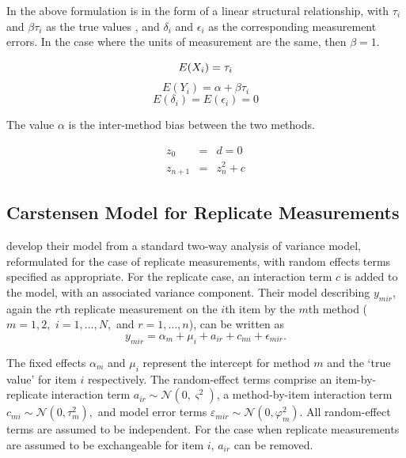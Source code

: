 \documentclass[12pt, a4paper]{report}
\theoremstyle{plain}
\theoremstyle{definition}
\theoremstyle{remark}
\begin{document}
	In the above formulation is in the form of a linear structural
	relationship, with $\tau_{i}$ and $\beta\tau_{i}$ as the true
	values , and $\delta_{i}$ and $\epsilon_{i}$ as the corresponding
	measurement errors. In the case where the units of measurement are
	the same, then $\beta =1$.
	
	\begin{equation}
	E(X_{i}) = \tau_{i}\\
	\end{equation}
	\begin{equation}
	E(Y_{i}) = \alpha +\beta\tau_{i} \nonumber
	\end{equation}
	\begin{equation}
	E(\delta_{i}) = E(\epsilon_{i}) = 0 \nonumber
	\end{equation}
	
	The value $\alpha$ is the inter-method bias between the two
	methods.
	
	\begin{eqnarray}
	z_0 &=& d = 0 \\
	z_{n+1} &=& z_n^2+c
	\end{eqnarray}
	
	
	
	
	\subsection{Carstensen Model for Replicate Measurements}
	




	\citet{BXC2008} develop their model from a standard two-way analysis of variance model, reformulated for the case of replicate measurements, with random effects terms specified as appropriate. 
	For the replicate case, an interaction term $c$ is added to the model, with an associated variance component. Their model describing $y_{mir} $, again the $r$th replicate measurement on the $i$th item by the $m$th method ($m=1,2,$ $i=1,\ldots,N,$ and $r = 1,\ldots,n$), can be written as
	\begin{equation}\label{BXC-model}
		y_{mir}  = \alpha_{m} + \mu_{i} + a_{ir} + c_{mi} + \epsilon_{mir}.
	\end{equation}
	
The fixed effects $\alpha_{m}$ and $\mu_{i}$ represent the intercept for method $m$ and the `true value' for item $i$ respectively. The random-effect terms comprise an item-by-replicate interaction term $a_{ir} \sim \mathcal{N}(0,\varsigma^{2})$, a method-by-item interaction term $c_{mi} \sim \mathcal{N}(0,\tau^{2}_{m}),$ and model error terms $\varepsilon_{mir} \sim \mathcal{N}(0,\varphi^{2}_{m}).$ All random-effect terms are assumed to be independent. For the case when replicate measurements are assumed to be exchangeable for item $i$, $a_{ir}$ can be removed. 
\end{document}
